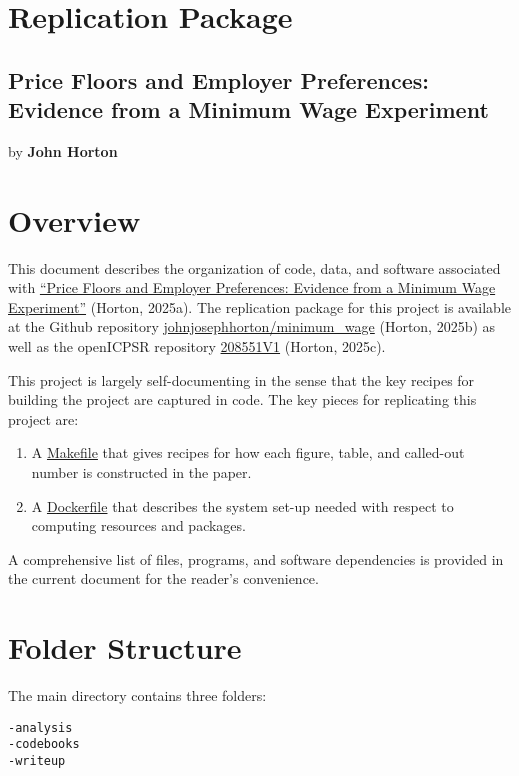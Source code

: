 \documentclass[10pt]{article}
\begin{document}
\section*{Replication Package}
\subsection*{Price Floors and Employer Preferences: Evidence from a Minimum Wage Experiment}
by \textbf{John Horton}

\section{Overview}

This document describes the organization of code, data, and software associated with \href{https://www.aeaweb.org/articles?id=10.1257/aer.20170637}{``Price Floors and Employer Preferences: Evidence from a Minimum Wage Experiment''} (Horton, 2025a). The replication package for this project is available at the Github repository \href{https://www.github.com/johnjosephhorton/minimum_wage.git}{johnjosephhorton/minimum\_wage} (Horton, 2025b) as well as the openICPSR repository \href{http://doi.org/10.3886/E208551V1}{208551V1} (Horton, 2025c).

This project is largely self-documenting in the sense that the key recipes for building the project are captured in code. The key pieces for replicating this project are:
\begin{enumerate}[label=\arabic*.]
  \item A \href{https://www.github.com/johnjosephhorton/minimum_wage/blob/main/writeup/Makefile}{Makefile} that gives recipes for how each figure, table, and called-out number is constructed in the paper.
  \item A \href{https://www.github.com/johnjosephhorton/minimum_wage/blob/main/writeup/Dockerfile}{Dockerfile} that describes the system set-up needed with respect to computing resources and packages.
\end{enumerate}

A comprehensive list of files, programs, and software dependencies is provided in the current document for the reader's convenience.

\section{Folder Structure}

The main directory contains three folders:
\begin{verbatim}
-analysis
-codebooks
-writeup
\end{verbatim}
\end{document}
